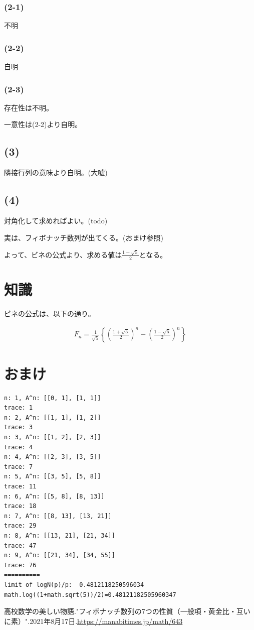 \documentclass[a4paper, 10pt, dvipdfmx]{jlreq}
\begin{document}
\subsubsection*{(2-1)}

不明

\subsubsection*{(2-2)}

自明

\subsubsection*{(2-3)}

存在性は不明。

一意性は(2-2)より自明。

\subsection*{(3)}

隣接行列の意味より自明。(大嘘)

\subsection*{(4)}

対角化して求めればよい。(todo)

実は、フィボナッチ数列が出てくる。(おまけ参照)

よって、ビネの公式より、求める値は$\frac{1+\sqrt{5}}{2}$となる。

\section{知識}

ビネの公式は、以下の通り。\cite{site:binet}

\begin{align*}
  F_n=\frac{1}{\sqrt{5}}\left\{ \left( \frac{1+\sqrt{5}}{2} \right)^n - \left( \frac{1-\sqrt{5}}{2} \right)^n \right\}
\end{align*}

\section{おまけ}



\begin{lstlisting}[caption=result, label=code:result]
n: 1, A^n: [[0, 1], [1, 1]]
trace: 1
n: 2, A^n: [[1, 1], [1, 2]]
trace: 3
n: 3, A^n: [[1, 2], [2, 3]]
trace: 4
n: 4, A^n: [[2, 3], [3, 5]]
trace: 7
n: 5, A^n: [[3, 5], [5, 8]]
trace: 11
n: 6, A^n: [[5, 8], [8, 13]]
trace: 18
n: 7, A^n: [[8, 13], [13, 21]]
trace: 29
n: 8, A^n: [[13, 21], [21, 34]]
trace: 47
n: 9, A^n: [[21, 34], [34, 55]]
trace: 76
==========
limit of logN(p)/p:  0.4812118250596034
math.log((1+math.sqrt(5))/2)=0.48121182505960347
\end{lstlisting}

\begin{thebibliography}{9}
  高校数学の美しい物語."フィボナッチ数列の7つの性質（一般項・黄金比・互いに素）".2021年8月17日.\url{https://manabitimes.jp/math/643}
\end{thebibliography}
\end{document}
